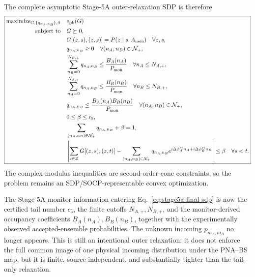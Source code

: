 \documentclass[11pt]{article}
\theoremstyle{remark}
\begin{document}
The complete asymptotic Stage-5A outer-relaxation SDP is therefore
\begin{equation}
\boxed{
\begin{aligned}
    \text{maximize}_{G,\{q_{n_A,n_B}\},\beta}
    \quad&
    e_{\rm ph}(G)
    \\
    \text{subject to}\quad&
    G\succeq0,
    \\
    &
    G[(z,s),(z,s)]
    =
    P(z\mid s,A_{\rm mon})
    \quad
    \forall z,s,
    \\
    &
    q_{n_A,n_B}\ge0
    \quad
    \forall (n_A,n_B)\in\mathcal N_+,
    \\
    &
    \sum_{n_B=0}^{N_{B,+}}q_{n_A,n_B}
    \le
    \frac{B_A(n_A)}{P_{\rm mon}}
    \quad
    \forall n_A\le N_{A,+},
    \\
    &
    \sum_{n_A=0}^{N_{A,+}}q_{n_A,n_B}
    \le
    \frac{B_B(n_B)}{P_{\rm mon}}
    \quad
    \forall n_B\le N_{B,+},
    \\
    &
    q_{n_A,n_B}
    \le
    \frac{B_A(n_A)B_B(n_B)}{P_{\rm mon}}
    \quad
    \forall (n_A,n_B)\in\mathcal N_+,
    \\
    &
    0\le\beta\le\epsilon_5,
    \\
    &
    \sum_{(n_A,n_B)\in\mathcal N_+}
    q_{n_A,n_B}
    +
    \beta
    =
    1,
    \\
    &
    \left|
      \sum_{z\in\mathcal Z}G[(z,s),(z,t)]
      -
      \sum_{(n_A,n_B)\in\mathcal N_+}
      q_{n_A,n_B}
      e^{
        i\Delta\phi_A^{st}n_A
        +
        i\Delta\phi_B^{st}n_B
      }
    \right|
    \le
    \beta
    \quad
    \forall s<t.
\end{aligned}
}
\label{eq:stage5a-final-sdp}
\end{equation}
The complex-modulus inequalities are second-order-cone constraints, so the
problem remains an SDP/SOCP-representable convex optimization.

The Stage-5A monitor information entering
Eq.~\eqref{eq:stage5a-final-sdp} is now the certified tail number
\(\epsilon_5\), the finite cutoffs \(N_{A,+},N_{B,+}\), and the
monitor-derived occupancy coefficients \(B_A(n_A),B_B(n_B)\), together with
the experimentally observed accepted-ensemble probabilities.  The unknown
incoming \(p_{m_A,m_B}\) no longer appears.  This is still an intentional
outer relaxation: it does not enforce the full common image of one physical
incoming distribution under the PNA--BS map, but it is finite, source
independent, and substantially tighter than the tail-only relaxation.
\end{document}
